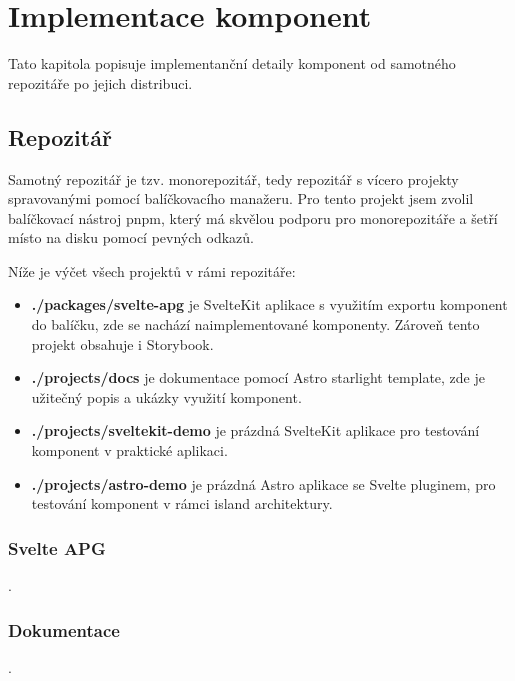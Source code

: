 \chapter{Implementace komponent}

Tato kapitola popisuje implementanční detaily komponent od samotného repozitáře po jejich distribuci.

\section{Repozitář}

Samotný repozitář je tzv. monorepozitář, tedy repozitář s vícero projekty spravovanými pomocí balíčkovacího manažeru.
Pro tento projekt jsem zvolil balíčkovací nástroj pnpm, který má skvělou podporu pro monorepozitáře a šetří místo na disku pomocí pevných odkazů.

Níže je výčet všech projektů v rámi repozitáře:


\begin{itemize}
    \item \textbf{./packages/svelte-apg} je SvelteKit aplikace s využitím exportu komponent do balíčku, zde se nachází naimplementované komponenty. Zároveň tento projekt obsahuje i Storybook.
    \item \textbf{./projects/docs} je dokumentace pomocí Astro starlight template, zde je užitečný popis a ukázky využití komponent.
    \item \textbf{./projects/sveltekit-demo} je prázdná SvelteKit aplikace pro testování komponent v praktické aplikaci.
    \item \textbf{./projects/astro-demo} je prázdná Astro aplikace se Svelte pluginem, pro testování komponent v rámci island architektury.
\end{itemize}

\subsection{Svelte APG}

.

\subsection{Dokumentace}

.
